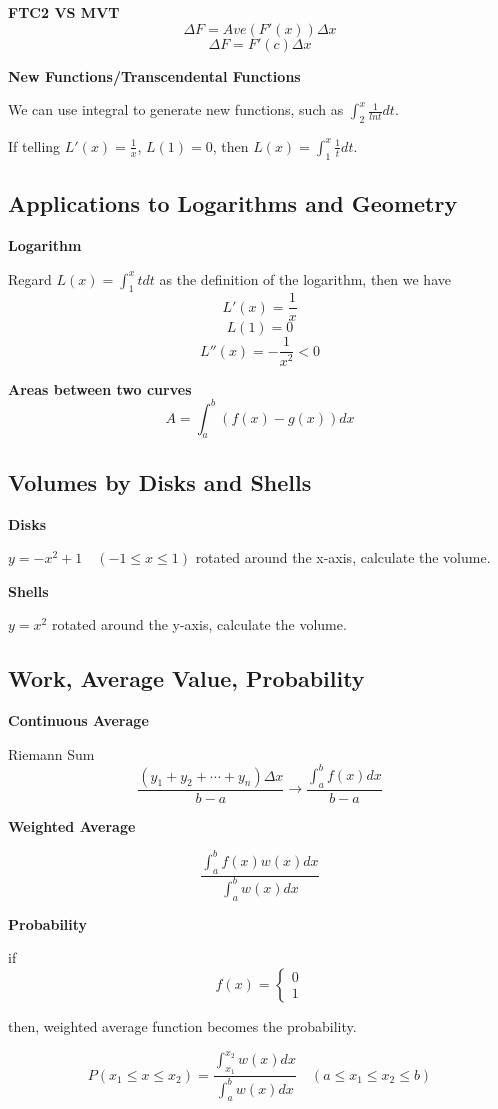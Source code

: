 \documentclass{article}
\newcommand\defint[3]{\int_{#1}^{#2}#3dx}
\newcommand\upperxdefint[2]{\int_{#1}^x{#2}dt}
\begin{document}
\textbf{FTC2 VS MVT}
$$\Delta F = Ave(F'(x))\Delta x$$
$$\Delta F = F'(c)\Delta x$$

\textbf{New Functions/Transcendental Functions}

We can use integral to generate new functions, such as $\upperxdefint{2}{\frac{1}{lnt}}$.

If telling $L'(x) = \frac{1}{x}$, $L(1) = 0$, then $L(x) = \upperxdefint{1}{\frac{1}{t}}$.

\subsection{Applications to Logarithms and Geometry}
\textbf{Logarithm}

Regard $L(x) = \upperxdefint{1}{t}$ as the definition of the logarithm, then we have
$$L'(x) = \frac{1}{x}$$
$$L(1) = 0$$
$$L''(x) = -\frac{1}{x^2} < 0$$

\textbf{Areas between two curves}
$$A = \defint{a}{b}{(f(x) - g(x))}$$

\subsection{Volumes by Disks and Shells}
\textbf{Disks}

$y = -x^2+1 \quad (-1 \le x \le 1)$ rotated around the x-axis, calculate the volume.

\textbf{Shells}

$y = x^2$ rotated around the y-axis, calculate the volume.

\subsection{Work, Average Value, Probability}
\textbf{Continuous Average}

Riemann Sum
$$\frac{(y_1+y_2+\cdots+y_n)\Delta x}{b-a} \rightarrow \frac{\defint{a}{b}{f(x)}}{b-a}$$

\textbf{Weighted Average}

$$\frac{\defint{a}{b}{f(x)w(x)}}{\defint{a}{b}{w(x)}}$$

\textbf{Probability}

if
$$
f(x)=
\begin{cases}
0 \\
1
\end{cases}
$$

then, weighted average function becomes the probability.

$$P(x_1 \le x \le x_2) = \frac{\defint{x_1}{x_2}{w(x)}}{\defint{a}{b}{w(x)}} \quad (a \le x_1 \le x_2 \le b)$$
\end{document}
